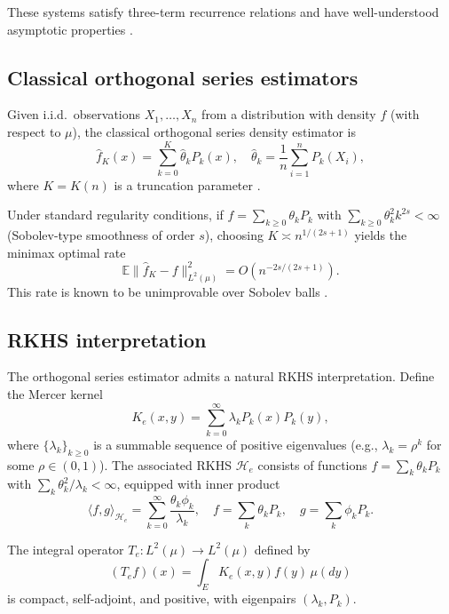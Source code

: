 \documentclass[11pt,a4paper]{article}
\newcommand{\E}{\mathbb{E}}
\newcommand{\RKHS}{\mathcal{H}}
\newcommand{\ip}[2]{\langle #1, #2 \rangle}
\begin{document}
These systems satisfy three-term recurrence relations and have well-understood asymptotic properties \citep{Ismail2005,Levin2001}.

\subsection{Classical orthogonal series estimators}

Given i.i.d.\ observations $X_1, \ldots, X_n$ from a distribution with density $f$ (with respect to $\mu$), the classical orthogonal series density estimator is
\begin{equation}\label{eq:series_estimator}
\hat{f}_{K}(x) = \sum_{k=0}^{K} \hat{\theta}_k P_k(x), \quad \hat{\theta}_k = \frac{1}{n} \sum_{i=1}^{n} P_k(X_i),
\end{equation}
where $K = K(n)$ is a truncation parameter \citep{Efromovich1999,Wasserman2006}.

Under standard regularity conditions, if $f = \sum_{k \geq 0} \theta_k P_k$ with $\sum_{k \geq 0} \theta_k^2 k^{2s} < \infty$ (Sobolev-type smoothness of order $s$), choosing $K \asymp n^{1/(2s+1)}$ yields the minimax optimal rate
\[
\E \|\hat{f}_K - f\|^2_{L^2(\mu)} = O(n^{-2s/(2s+1)}).
\]
This rate is known to be unimprovable over Sobolev balls \citep{Tsybakov2009}.

\subsection{RKHS interpretation}

The orthogonal series estimator admits a natural RKHS interpretation. Define the Mercer kernel
\begin{equation}\label{eq:mercer_kernel}
K_e(x, y) = \sum_{k=0}^{\infty} \lambda_k P_k(x) P_k(y),
\end{equation}
where $\{\lambda_k\}_{k \geq 0}$ is a summable sequence of positive eigenvalues (e.g., $\lambda_k = \rho^k$ for some $\rho \in (0,1)$). The associated RKHS $\RKHS_e$ consists of functions $f = \sum_k \theta_k P_k$ with $\sum_k \theta_k^2 / \lambda_k < \infty$, equipped with inner product
\[
\ip{f}{g}_{\RKHS_e} = \sum_{k=0}^{\infty} \frac{\theta_k \phi_k}{\lambda_k}, \quad f = \sum_k \theta_k P_k, \quad g = \sum_k \phi_k P_k.
\]

The integral operator $T_e : L^2(\mu) \to L^2(\mu)$ defined by
\[
(T_e f)(x) = \int_E K_e(x, y) f(y) \, \mu(dy)
\]
is compact, self-adjoint, and positive, with eigenpairs $(\lambda_k, P_k)$.
\end{document}
